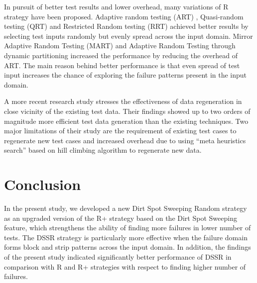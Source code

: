 \documentclass[conference]{IEEEtran}
\begin{document}
\noindent In pursuit of better test results and lower overhead, many variations of R strategy have been proposed. Adaptive random testing (ART) \cite{Chen2008}, Quasi-random testing (QRT) \cite{Chen2005} and Restricted Random testing (RRT) \cite{Chan2002} achieved better results by selecting test inputs randomly but evenly spread across the input domain. Mirror Adaptive Random Testing (MART) \cite{Chen2003} and Adaptive Random Testing through dynamic partitioning \cite{Chen2003} increased the performance by reducing the overhead of ART. The main reason behind better performance is that even spread of test input increases the chance of exploring the failure patterns present in the input domain.

\noindent A more recent research study \cite{Yoo2012} stresses the effectiveness of data regeneration in close vicinity of the existing test data. Their findings showed up to two orders of magnitude more efficient test data generation than the existing techniques. Two major limitations of their study are the requirement of existing test cases to regenerate new test cases and increased overhead due to using ``meta heuristics search'' based on hill climbing algorithm to regenerate new data. 
  





\section{Conclusion}\label{sec:conc}
\noindent In the present study, we developed a new Dirt Spot Sweeping Random strategy as an upgraded version of the R+ strategy based on the Dirt Spot Sweeping feature, which strengthens the ability of finding more failures in lower number of tests. The DSSR strategy is particularly more effective when the failure domain forms block and strip patterns across the input domain. In addition, the findings of the present study indicated significantly better performance of DSSR in comparison with R and R+ strategies with respect to finding higher number of failures. 
\end{document}
